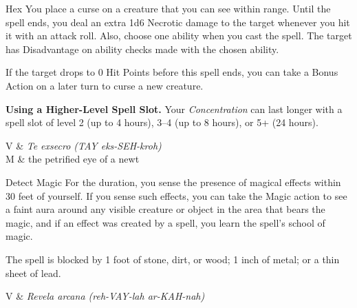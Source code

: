\begin{Spell}[
  tags=Concentration,
  level=1st,
  time=1 Bonus Action,
  range=90 ft.,
  components={V, S, M},
  duration=1 Hour,
  school=Enchantment,
  attack=None,
  effect=Necrotic
]{Hex}
You place a curse on a creature that you can see within range. Until the spell ends, you deal an extra 1d6 Necrotic damage to the target whenever you hit it with an attack roll. Also, choose one ability when you cast the spell. The target has Disadvantage on ability checks made with the chosen ability.

If the target drops to 0 Hit Points before this spell ends, you can take a Bonus Action on a later turn to curse a new creature.

\textbf{Using a Higher-Level Spell Slot.} Your \textit{Concentration} can last longer with a spell slot of level 2 (up to 4 hours), 3–4 (up to 8 hours), or 5+ (24 hours).

\begin{components}
V & \textit{Te exsecro (TAY eks-SEH-kroh)}\\
M & the petrified eye of a newt
\end{components}

\end{Spell}

\begin{Spell}[
  tags={Concentration, Ritual},
  level=1st,
  time=1 Action,
  range=Self (30 ft.),
  components={V, S},
  duration=10 Minutes,
  school=Divination,
  attack=None,
  effect=Detection
]{Detect Magic}
For the duration, you sense the presence of magical effects within 30 feet of yourself. If you sense such effects, you can take the Magic action to see a faint aura around any visible creature or object in the area that bears the magic, and if an effect was created by a spell, you learn the spell's school of magic.

The spell is blocked by 1 foot of stone, dirt, or wood; 1 inch of metal; or a thin sheet of lead.

\begin{components}
V & \textit{Revela arcana (reh-VAY-lah ar-KAH-nah)}
\end{components}
\end{Spell}

